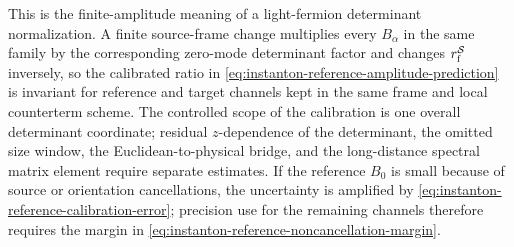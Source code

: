 \begin{controlledapproximation}
This is the finite-amplitude meaning of a light-fermion determinant
normalization.  A finite source-frame change multiplies every \(B_\alpha\) in
the same family by the corresponding zero-mode determinant factor and changes
\(r_{\rm f}^{\mathcal S}\) inversely, so the calibrated ratio in
\eqref{eq:instanton-reference-amplitude-prediction} is invariant for reference
and target channels kept in the same frame and local counterterm
scheme.  The controlled scope of the calibration is one overall determinant
coordinate; residual \(z\)-dependence of the determinant, the omitted size
window, the Euclidean-to-physical bridge, and the long-distance spectral matrix
element require separate estimates.  If the reference \(B_0\) is small because
of source or orientation cancellations, the uncertainty is amplified by
\eqref{eq:instanton-reference-calibration-error}; precision use for the
remaining channels therefore requires the margin in
\eqref{eq:instanton-reference-noncancellation-margin}.
\end{controlledapproximation}

